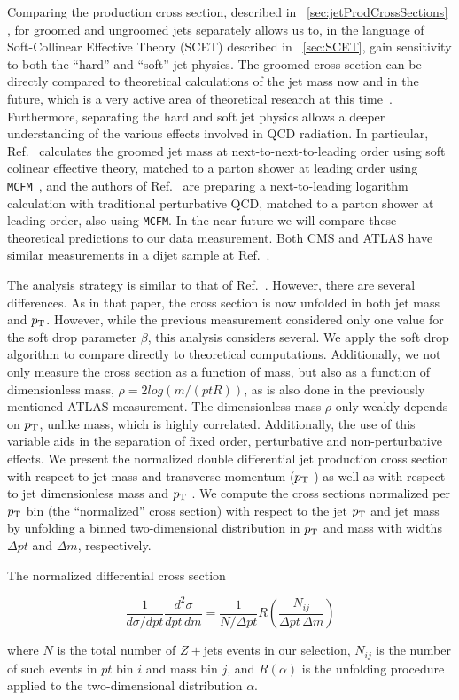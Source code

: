 Comparing the production cross section, described in ~\ref{sec:jetProdCrossSections} , for groomed and ungroomed jets separately allows us to, in the language of Soft-Collinear Effective Theory (SCET) described in ~\ref{sec:SCET},
gain sensitivity to both the ``hard'' and ``soft'' jet physics. 
The groomed cross section can be directly compared to theoretical calculations of the jet mass
now and in the future, which is a very active area of theoretical research
at this time~\cite{Dasgupta:2012hg,Chien:2012ur,Jouttenus:2013hs,Almeida:2014uva,Liu:2014oog,Stewart:2014nna,Khelifa-Kerfa:2015mma,Frye:2016aiz,Kolodrubetz:2016dzb}. Furthermore, separating the hard and soft jet physics
allows a deeper understanding of the various effects involved in QCD
radiation. In particular, Ref.~\cite{Frye:2016aiz} calculates the
groomed jet mass at next-to-next-to-leading order using soft colinear effective theory, matched to a
parton shower at leading order using {\tt MCFM}~\cite{MCFM1,MCFM2}, and the authors of Ref.~\cite{mmdt}  are preparing a next-to-leading logarithm calculation with traditional perturbative QCD, matched to a 
parton shower at leading order, also using {\tt MCFM}.  In the near future we will compare these theoretical predictions to our data measurement. Both CMS and ATLAS have similar measurements in a dijet sample at Ref.~\cite{cms_jetmassDijet, atlas_jetmass2}.

The analysis strategy is similar to that of Ref.~\cite{cms_jetmassDijet}.
However, there are several differences. As in that paper, the cross section is now
unfolded in both jet mass and $p_{\mathrm{T}}$. However, while the previous measurement
considered only one value for the soft drop parameter $\beta$, this analysis considers several.
We apply the soft drop algorithm to compare directly to theoretical computations. Additionally, we not only measure the cross section as a function of mass, but also as a function of dimensionless mass, $\rho = 2log(m/(pt R))$, as is also done in the previously mentioned ATLAS measurement.  The dimensionless mass $\rho$ only weakly depends on $p_{\mathrm{T}}$, unlike mass, which is highly correlated. Additionally, the use of this variable aids in the separation of fixed order, perturbative and non-perturbative effects.
We present the normalized double differential jet production cross section with respect to jet mass and transverse momentum ($p_{\mathrm{T}}$ ) as well as with respect to jet dimensionless mass and $p_{\mathrm{T}}$ . We compute the cross sections normalized per $p_{\mathrm{T}}$ bin
(the ``normalized'' cross section) with respect to the jet $p_{\mathrm{T}}$ and jet mass 
by unfolding a binned two-dimensional distribution in $p_{\mathrm{T}}$ and mass
with widths $\Delta pt$ and $\Delta m$, respectively.

The normalized differential cross section

\begin{equation}
\frac{1}{d\sigma/dpt}\frac{d^2\sigma}{dpt\,dm} = \frac{1}{N/\Delta pt} R(\frac{N_{ij}}{ \Delta pt \,\Delta m} )
\end{equation}

where $N$ is the total number of $Z+$jets events in our selection,
$N_{ij}$ is the number of such events in $pt$ bin $i$ and mass bin $j$,
and $R(\alpha)$ is the unfolding procedure applied to the two-dimensional
distribution $\alpha$.